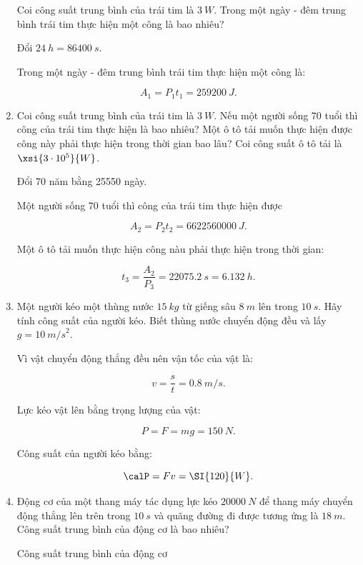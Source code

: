 \begin{enumerate}[label=\bfseries Câu \arabic*:]
	
	{
		Coi công suất trung bình của trái tim là $\SI{3}{W}$. Trong một ngày - đêm trung bình trái tim thực hiện một công là bao nhiêu?
	}
	
	\hideall
	{	Đổi $\SI{24}{h} = \SI{86400}{s}.$
		
		Trong một ngày - đêm trung bình trái tim thực hiện một công là:
		
		$$A_1 = P_1t_1 = \SI{259200}{J}.$$
	}
	\item {}
	
	
	{
		Coi công suất trung bình của trái tim là $\SI{3}{W}$. Nếu một người sống 70 tuổi thì công của trái tim thực hiện là bao nhiêu? Một ô tô tải muốn thực hiện được công này phải thực hiện trong thời gian bao lâu? Coi công suất ô tô tải là $\xsi{3\cdot 10^5}{W}$.
	}
	
	\hideall
	{	
		
		
		Đổi 70 năm bằng 25550 ngày.
		
		Một người sống 70 tuổi thì công của trái tim thực hiện được
		
		$$A_2 = P_2t_2 = \SI{6622560000}{J}.$$
		
		Một ô tô tải muốn thực hiện công nàu phải thực hiện trong thời gian:
		
		$$t_3 = \dfrac{A_2}{P_3} = \SI{22075,2}{s} = \SI{6,132}{h}.$$
		
	}
		\item {}
	
	
	{
		Một người kéo một thùng nước $\SI{15}{kg}$ từ giếng sâu $\SI{8}{m}$ lên trong $\SI{10}{s}$. Hãy tính công suất của người kéo. Biết thùng nước chuyển động đều và lấy $g=\SI{10}{m/s}^2$.
	}
	
	\hideall
	{	
		Vì vật chuyển động thẳng đều nên vận tốc của vật là:
		
		$$v = \dfrac{s}{t} = \SI{0,8}{m/s}.$$
		
		Lực kéo vật lên bằng trọng lượng của vật:
		
		$$P = F = mg = \SI{150}{N}.$$
		
		Công suất của người kéo bằng:
		
		$$ \calP = Fv = \SI{120}{W}.$$
	}
	\item {}
	
	
	{
		Động cơ của một thang máy tác dụng lực kéo $\SI{20000}{N}$ để thang máy chuyển động thẳng lên trên trong $\SI{10}{s}$ và quãng đường đi được tương ứng là $\SI{18}{m}$. Công suất trung bình của động cơ là bao nhiêu?
	}
	
	\hideall
	{	
		Công suất trung bình của động cơ
		
}
\end{enumerate}
